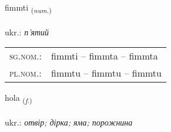 \documentclass[frontgrid, backgrid]{flacards}\usepackage[]{graphicx}\usepackage[]{xcolor}
\begin{document}
\renewcommand{\flhead}{\vskip5pt \fboxsep=0pt {\small\bfseries\footnotesize Töluorð | чисельник}}
\renewcommand{\fcfoot}{\vskip5pt \fboxsep=0pt \hspace{2pt}{\small\bfseries\footnotesize 2K}}

\renewcommand{\blhead}{\vskip5pt {\small\bfseries\footnotesize Töluorð | чисельник }}
\renewcommand{\bcfoot}{\vskip5pt \hspace{2pt}{\small\bfseries\footnotesize 2K}}


{fimmti \small{\textsubscript{(\textit{num.})}} \\[1ex] %
\textphonetic{[fɪm̥tɪ]} \\
ukr.: \emph{п'ятий} \\  [2ex]
\renewcommand*{\arraystretch}{0.8}
\begin{tabular}{ll}
\textsc{sg.nom.}: & fimmti  --  fimmta -- fimmta \\ 
\textsc{pl.nom.}: & fimmtu -- fimmtu -- fimmtu
\end{tabular}
}

\renewcommand{\flhead}{\vskip5pt \fboxsep=0pt {\small\bfseries\footnotesize Nafnorð | іменник}}
\renewcommand{\fcfoot}{\vskip5pt \fboxsep=0pt \hspace{2pt}{\small\bfseries\footnotesize 2K}}

\renewcommand{\blhead}{\vskip5pt {\small\bfseries\footnotesize Nafnorð | іменник }}
\renewcommand{\bcfoot}{\vskip5pt \hspace{2pt}{\small\bfseries\footnotesize 2K}}


{hola \small{\textsubscript{(\textit{f.})}} \\[1ex] %
\textphonetic{[hɔːla]} \\
ukr.: \emph{отвір; дірка; яма; порожнина} \\  [2ex]
\renewcommand*{\arraystretch}{0.8}
}
\end{document}
